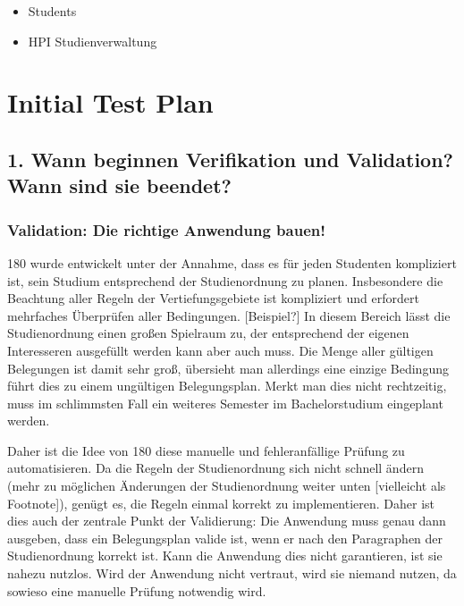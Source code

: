 \documentclass[ngerman]{article}
\begin{document}
\begin{itemize}
\itemsep1pt\parskip0pt
\item
  Students
\item
  HPI Studienverwaltung
\end{itemize}

\section{Initial Test Plan}\label{initial-test-plan}

\subsection{1. Wann beginnen Verifikation und Validation? Wann sind sie
beendet?}\label{wann-beginnen-verifikation-und-validation-wann-sind-sie-beendet}

\subsubsection{Validation: Die richtige Anwendung
bauen!}\label{validation-die-richtige-anwendung-bauen}

180 wurde entwickelt unter der Annahme, dass es für jeden Studenten
kompliziert ist, sein Studium entsprechend der Studienordnung zu planen.
Insbesondere die Beachtung aller Regeln der Vertiefungsgebiete ist
kompliziert und erfordert mehrfaches Überprüfen aller Bedingungen.
{[}Beispiel?{]} In diesem Bereich lässt die Studienordnung einen großen
Spielraum zu, der entsprechend der eigenen Interesseren ausgefüllt
werden kann aber auch muss. Die Menge aller gültigen Belegungen ist
damit sehr groß, übersieht man allerdings eine einzige Bedingung führt
dies zu einem ungültigen Belegungsplan. Merkt man dies nicht
rechtzeitig, muss im schlimmsten Fall ein weiteres Semester im
Bachelorstudium eingeplant werden.

Daher ist die Idee von 180 diese manuelle und fehleranfällige Prüfung zu
automatisieren. Da die Regeln der Studienordnung sich nicht schnell
ändern (mehr zu möglichen Änderungen der Studienordnung weiter unten
{[}vielleicht als Footnote{]}), genügt es, die Regeln einmal korrekt zu
implementieren. Daher ist dies auch der zentrale Punkt der Validierung:
Die Anwendung muss genau dann ausgeben, dass ein Belegungsplan valide
ist, wenn er nach den Paragraphen der Studienordnung korrekt ist. Kann
die Anwendung dies nicht garantieren, ist sie nahezu nutzlos. Wird der
Anwendung nicht vertraut, wird sie niemand nutzen, da sowieso eine
manuelle Prüfung notwendig wird.
\end{document}
